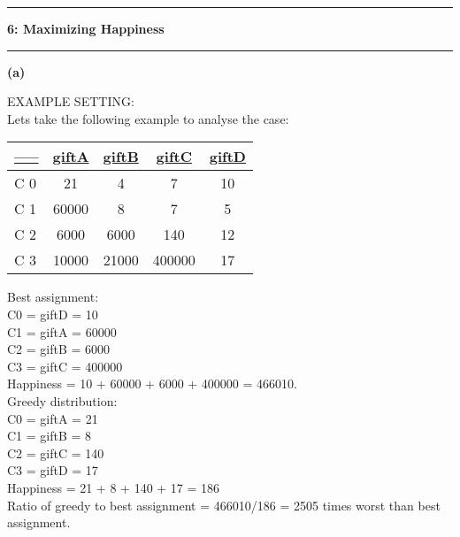 \documentclass[11pt]{article}
\newcommand\question[2]{\vspace{.25in}\hrule\textbf{#1: #2}\vspace{.5em}\hrule\vspace{.10in}}
\renewcommand\part[1]{\vspace{.10in}\textbf{(#1)}}
\begin{document}
\question{6}{Maximizing Happiness}
\part{a}



EXAMPLE SETTING:\\
Lets take the following example to analyse the case:\\
\bgroup 
\def\arraystretch{1.8}
\begin{tabular}{|l|c|c|c|c|} \hline 
{\bf \underline {-----}} & {\bf \underline {giftA}} & {\bf \underline {giftB}} & {\bf \underline {giftC}} & {\bf \underline {giftD}} \\ \hline

C 0 & 21 & 4 & 7 & 10 \\ \hline
C 1 & 60000 & 8 & 7 & 5 \\ \hline
C 2 & 6000 & 6000 & 140 & 12 \\ \hline
C 3 & 10000 & 21000 & 400000 & 17 \\ \hline

\end{tabular}
\egroup

Best assignment:\\ 
C0 = giftD = 10\\
C1 = giftA = 60000\\
C2 = giftB = 6000\\
C3 = giftC = 400000\\
Happiness = 10 + 60000 + 6000 + 400000 = 466010.\\

Greedy distribution:\\
C0 = giftA = 21\\
C1 = giftB = 8\\
C2 = giftC = 140\\
C3 = giftD = 17\\
Happiness = 21 + 8 + 140 + 17 = 186\\

Ratio of greedy to best assignment = 466010/186 = 2505 times worst than best assignment.\\ 
\end{document}
